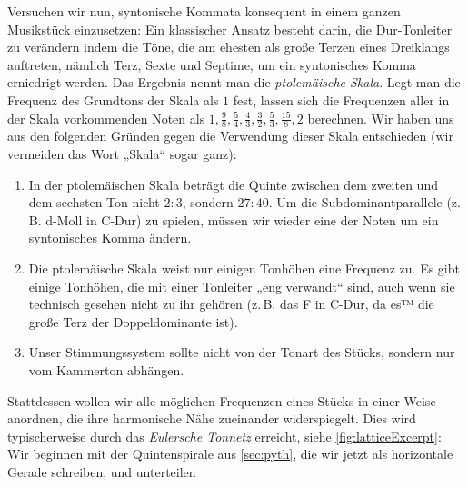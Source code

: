 \documentclass[ngerman,11pt]{scrartcl}
\begin{document}
Versuchen wir nun, syntonische Kommata konsequent in einem ganzen Musikstück
einzusetzen: Ein klassischer Ansatz besteht darin, die Dur-Tonleiter zu
verändern indem die Töne, die am ehesten als große Terzen eines Dreiklangs
auftreten, nämlich Terz, Sexte und Septime, um ein syntonisches Komma erniedrigt
werden. Das Ergebnis nennt man die \emph{ptolemäische Skala}. Legt man die
Frequenz des Grundtons der Skala als $1$ fest, lassen sich die Frequenzen aller
in der Skala vorkommenden Noten als 
$1,\frac98,\frac54,\frac43,\frac32,\frac53,\frac{15}8,2$ berechnen. Wir haben
uns aus den folgenden Gründen gegen die Verwendung dieser Skala entschieden
(wir vermeiden das Wort „Skala“ sogar ganz):
\begin{enumerate}
\item In der ptolemäischen Skala beträgt die Quinte zwischen dem zweiten und dem
  sechsten Ton nicht $2:3$, sondern $27:40$. Um die Subdominantparallele
  (z.\,B. d-Moll in C-Dur) zu spielen, müssen wir wieder eine der Noten um ein
  syntonisches Komma ändern.
\item Die ptolemäische Skala weist nur einigen Tonhöhen eine Frequenz zu. Es 
  gibt einige Tonhöhen, die mit einer Tonleiter „eng verwandt“ sind, auch wenn
  sie technisch gesehen nicht zu ihr gehören (z.\,B. das \sharp F in C-Dur, da
  es™ die große Terz der Doppeldominante ist).
\item Unser Stimmungssystem sollte nicht von der Tonart des Stücks, sondern nur
  vom Kammerton abhängen.
\end{enumerate}
Stattdessen wollen wir alle möglichen Frequenzen eines Stücks in einer Weise
anordnen, die ihre harmonische Nähe zueinander widerspiegelt. Dies wird
typischerweise durch das \emph{Eulersche Tonnetz} erreicht, siehe
\cref{fig:latticeExcerpt}: Wir beginnen mit der Quintenspirale aus
\cref{sec:pyth}, die wir jetzt als horizontale Gerade schreiben, und unterteilen
\end{document}
